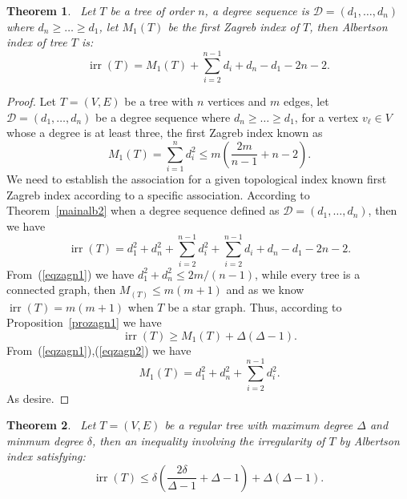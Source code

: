 \documentclass[12pt]{amsart}
\newcommand{\irr}{\operatorname{irr}}
\newtheorem{theorem}{Theorem}[section]
\begin{document}
\begin{theorem}~\label{mainalb3}
    Let  $T$ be a tree of order $n$, a degree sequence is $\mathscr{D}=(d_1,\dots,d_n)$ where $d_n\geqslant \dots \geqslant d_1$, let $M_1(T)$ be the first Zagreb index of $T$, then Albertson index of tree $T$ is: 
    \[
    \irr(T)=M_1(T)+\sum_{i=2}^{n-1} d_i+d_n - d_1-2n-2.
    \]
\end{theorem}
\begin{proof}
Let $T=(V,E)$ be a tree with $n$ vertices and $m$ edges, let $\mathscr{D}=(d_1,\dots,d_n)$ be a degree sequence where $d_n\geqslant \dots \geqslant d_1$, for a vertex $v_\ell \in V$ whose a degree is at least three, the first Zagreb index known as 
\begin{equation}~\label{eqzagn1}
M_1(T)=\sum_{i=1}^{n}d_i^2\leq m\left(\frac{2m}{n-1}+n-2\right).
\end{equation}
We need to establish the association for a given topological index known first Zagreb index according to a specific association. According to Theorem~\ref{mainalb2} when a degree sequence defined  as $\mathscr{D}=(d_1,\dots,d_n)$, then we have 
\begin{equation}~\label{eqzagn2}
    \irr(T)=d_1^2+d_n^2+\sum_{i=2}^{n-1} d_i^2+\sum_{i=2}^{n-1} d_i+d_n - d_1-2n-2.
\end{equation}
From~(\ref{eqzagn1}) we have $d_1^2+d_n^2\leq 2m/(n-1)$, while every tree is a connected graph, then $M_(T)\leq m(m+1)$ and as we know $\irr(T)=m(m+1)$ when $T$ be a star graph. Thus, according to Proposition~\ref{prozagn1} we have
\begin{equation}~\label{eqzagn3}
    \irr(T)\geq M_1(T)+\Delta(\Delta-1).
\end{equation}
From~(\ref{eqzagn1}),(\ref{eqzagn2}) we have
\begin{equation}~\label{eqzagn4}
M_1(T)=d_1^2+d_n^2+\sum_{i=2}^{n-1} d_i^2.
\end{equation}
As desire.
\end{proof}
\begin{theorem}~\label{mainalb4}
Let $T=(V,E)$ be a regular tree with maximum degree $\Delta$ and minmum  degree $\delta$, then  an inequality involving the irregularity of $T$ by Albertson index satisfying: 
    \[
    \irr(T) \leq \delta \left( \frac{2\delta}{\Delta - 1} + \Delta - 1 \right) + \Delta (\Delta - 1).
    \]
\end{theorem}
\end{document}
